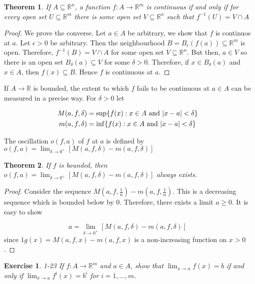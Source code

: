 \documentclass[12pt]{book}
\newtheorem{theorem}{Theorem}
\newtheorem*{exercise*}{Exercise}
\newcommand{\tand}{\ \text{and} \ }
\begin{document}
\begin{theorem}
  If $A \subseteq \mathbb{R}^n$, a function $f : A \to \mathbb{R}^m$ is continuous if and only if for every open set $U \subseteq \mathbb{R}^m$ there is some open set $V\subseteq \mathbb{R}^n$ such that $f^{-1}(U) = V \cap A$
\end{theorem}

\begin{proof}
  We prove the converse. Let $a \in A$ be arbitrary, we show that $f$ is continuos at $a$. Let $\epsilon > 0$ be arbitrary. Then the neighbourhood $B = B_{\epsilon}(f(a)) \subseteq \mathbb{R}^m$ is open. Therefore, $f^{-1}(B) = V \cap A$  for some open set $V \subseteq \mathbb{R}^n$. But then, $a \in V$ so there is an open set $B_{\delta}(a) \subseteq V$  for some $\delta > 0$. Therefore, if $x \in B_{\delta}(a)$ and $x \in A$, then $f(x) \subseteq B$. Hence $f$ is continuous at $a$.  
\end{proof}

If $A \to \mathbb{R}$ is bounded, the extent to which $f$ fails to be continuous at $a \in A$ can be measured in a precise way. For $\delta > 0$ let

\begin{align*}
  M(a,f,\delta) &= \sup \{ f(x) : x \in A \tand  \abs{x-a} < \delta \}\\
  m(a,f,\delta) &= \inf \{ f(x) : x \in A \tand  \abs{x-a} < \delta \}\\  
\end{align*}

The oscillation $o(f,a)$ of $f$ at $a$ is defined by $o(f,a) = \displaystyle\lim_{\delta \to 0^+} [M(a,f,\delta) - m(a,f,\delta)]$

\begin{theorem}
  If $f$ is bounded, then $o(f,a) = \displaystyle\lim_{\delta \to 0^+} [M(a,f,\delta) - m(a,f,\delta)]$ always exists. 
\end{theorem}

\begin{proof}
  Consider the sequence $M(a,f,\frac{1}{n}) - m(a,f,\frac{1}{n})$. This is a decreasing sequence which is bounded below by $0$. Therefore, there exists a limit $a \ge 0$. It is easy to show

  \[
  a = \lim_{\delta \to 0^+} [M(a,f,\delta) - m(a,f,\delta)]
  \]
  since $1g(x) = M(a,f,x) - m(a,f,x)$ is a non-increasing function on $x > 0$. 
\end{proof}

\begin{exercise*}
  1-23 If $f : A \to \mathbb{R}^m$ and $a \in A$, show that $\lim_{x \to a} f(x) = b$ if and only if $\lim_{x \to a} f^i(x)= b^i$ for $i = 1,\ldots, m$. 
\end{exercise*}
\end{document}
